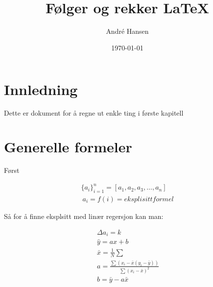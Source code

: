 \documentclass[12pt,a4paper]{article}
\title{Følger og rekker \LaTeX}
\author{André Hansen}
\date{\today}
\begin{document}
\maketitle
\onehalfspacing  %

\section*{Innledning}
Dette er dokument for å regne ut enkle ting i første kapitell

\section*{Generelle formeler}

Først

\begin{align}
\{a_i\}^n_{i=1} = [a_1,a_2,a_3,\ldots,a_n] \\
\ {a_i}=f(i)=eksplisitt formel
\end{align}

Så for å finne eksplsitt med linær regersjon kan man:

\begin{align}
\ {\Delta a_i=k} \\
\ \hat{y}=ax+b \\
\ \bar{x}=\frac{1}{N}\sum{}{} \\
\ a=\frac{\sum(x_i-\bar{x}(y_i-\bar{y}))}{\sum(x_i-\bar{x})^2} \\
\ b=\bar{y}-a\bar{x}
\end{align}
\end{document}
